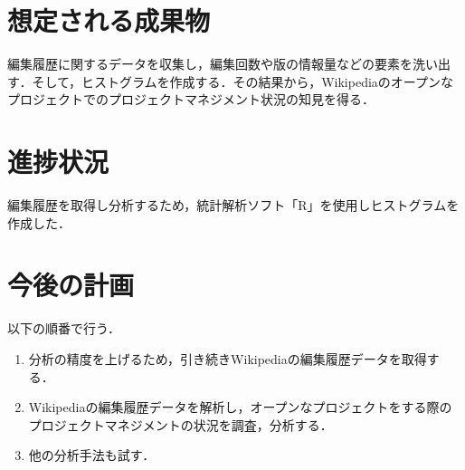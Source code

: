 \documentclass[uplatex,twocolumn,dvipdfmx]{jsarticle}
\begin{document}
\section{想定される成果物}

編集履歴に関するデータを収集し，編集回数や版の情報量などの要素を洗い出す．そして，ヒストグラムを作成する．その結果から，Wikipediaのオープンなプロジェクトでのプロジェクトマネジメント状況の知見を得る．

\section{進捗状況}

編集履歴を取得し分析するため，統計解析ソフト「R」を使用しヒストグラムを作成した．


\section{今後の計画}

以下の順番で行う．

\begin{enumerate}

 \item 分析の精度を上げるため，引き続きWikipediaの編集履歴データを取得する．
 \item Wikipediaの編集履歴データを解析し，オープンなプロジェクトをする際のプロジェクトマネジメントの状況を調査，分析する．
 \item 他の分析手法も試す．

\end{enumerate}



\end{document}
